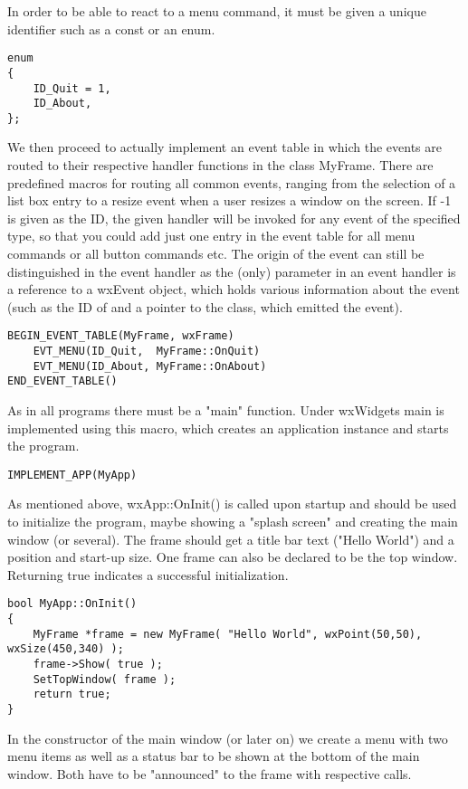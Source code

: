 In order to be able to react to a menu command, it must be given a unique
identifier such as a const or an enum.

\begin{verbatim}
enum
{
    ID_Quit = 1,
    ID_About,
};
\end{verbatim}

We then proceed to actually implement an event table in which the events
are routed to their respective handler functions in the class MyFrame.
There are predefined macros for routing all common events, ranging from
the selection of a list box entry to a resize event when a user resizes
a window on the screen. If -1 is given as the ID, the given handler will be
invoked for any event of the specified type, so that you could add just
one entry in the event table for all menu commands or all button commands etc.
The origin of the event can still be distinguished in the event handler as
the (only) parameter in an event handler is a reference to a wxEvent object,
which holds various information about the event (such as the ID of and a
pointer to the class, which emitted the event).

\begin{verbatim}
BEGIN_EVENT_TABLE(MyFrame, wxFrame)
    EVT_MENU(ID_Quit,  MyFrame::OnQuit)
    EVT_MENU(ID_About, MyFrame::OnAbout)
END_EVENT_TABLE()
\end{verbatim}

As in all programs there must be a "main" function. Under wxWidgets main is implemented
using this macro, which creates an application instance and starts the program.

\begin{verbatim}
IMPLEMENT_APP(MyApp)
\end{verbatim}

As mentioned above, wxApp::OnInit() is called upon startup and should be
used to initialize the program, maybe showing a "splash screen" and creating
the main window (or several). The frame should get a title bar text ("Hello World")
and a position and start-up size. One frame can also be declared to be the
top window. Returning true indicates a successful initialization.

\begin{verbatim}
bool MyApp::OnInit()
{
    MyFrame *frame = new MyFrame( "Hello World", wxPoint(50,50), wxSize(450,340) );
    frame->Show( true );
    SetTopWindow( frame );
    return true;
}
\end{verbatim}

In the constructor of the main window (or later on) we create a menu with two menu 
items as well as a status bar to be shown at the bottom of the main window. Both have 
to be "announced" to the frame with respective calls.

